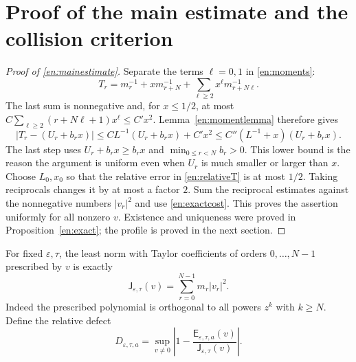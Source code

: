 \documentclass[12pt]{amsart}
\theoremstyle{definition}
\theoremstyle{remark}
\numberwithin{equation}{section}
\newcommand{\Cost}{\mathsf E}
\newcommand{\JetCost}{\mathsf J}
\theoremstyle{definition}
\begin{document}
\section{Proof of the main estimate and the collision criterion}
\begin{proof}[Proof of \eqref{en:mainestimate}]
Separate the terms $\ell=0,1$ in \eqref{en:moments}:
\[
 T_r=m_r^{-1}+xm_{r+N}^{-1}
     +\sum_{\ell\ge2}x^\ell m_{r+N\ell}^{-1}.
\]
The last sum is nonnegative and, for $x\le1/2$, at most
$C\sum_{\ell\ge2}(r+N\ell+1)x^\ell\le C'x^2$.
Lemma~\ref{en:momentlemma} therefore gives
\begin{equation}\label{en:relativeT}
 |T_r-(U_r+b_rx)|
 \le C L^{-1}(U_r+b_rx)+C'x^2
 \le C''(L^{-1}+x)(U_r+b_rx).
\end{equation}
The last step uses $U_r+b_rx\ge b_rx$ and
$\min_{0\le r<N}b_r>0$. This lower bound is the reason the argument
is uniform even when $U_r$ is much smaller or larger than $x$.
Choose $L_0,x_0$ so that the relative error in \eqref{en:relativeT}
is at most $1/2$. Taking reciprocals changes it by at most a factor
$2$. Sum the reciprocal estimates against the nonnegative numbers
$|v_r|^2$ and use \eqref{en:exactcost}. This proves the assertion
uniformly for all nonzero $v$. Existence and uniqueness were proved
in Proposition~\ref{en:exact}; the profile is proved in the next section.
\end{proof}

For fixed $\varepsilon,\tau$, the least norm with Taylor coefficients
of orders $0,\ldots,N-1$ prescribed by $v$ is exactly
\begin{equation}\label{en:jetcost}
 \JetCost_{\varepsilon,\tau}(v)=\sum_{r=0}^{N-1}m_r|v_r|^2.
\end{equation}
Indeed the prescribed polynomial is orthogonal to all powers $z^k$
with $k\ge N$. Define the relative defect
\begin{equation}\label{en:defect}
 D_{\varepsilon,\tau,a}
 =\sup_{v\ne0}\left|1-
 \frac{\Cost_{\varepsilon,\tau,a}(v)}{\JetCost_{\varepsilon,\tau}(v)}
 \right|.
\end{equation}
\end{document}
